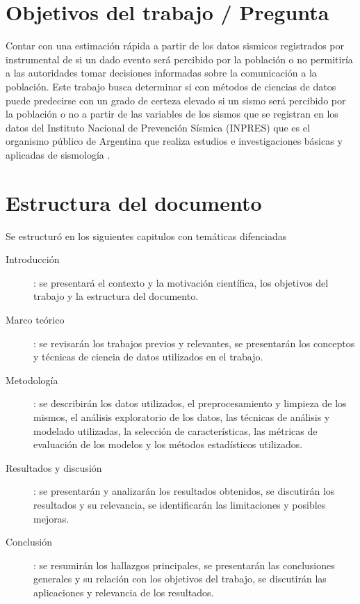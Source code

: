 \documentclass[a4paper]{report}
\begin{document}
\section{Objetivos del trabajo / Pregunta}
Contar con una estimación rápida a partir de los datos sismicos registrados por instrumental de si un dado evento será percibido por la población o no permitiría a las autoridades tomar decisiones informadas sobre la comunicación a la población.
Este trabajo busca determinar si con métodos de ciencias de datos puede predecirse con un grado de certeza elevado si un sismo será percibido por la población o no a partir de las variables de los sismos que se registran en los datos del Instituto Nacional de Prevención Sísmica (INPRES) que es el organismo público de Argentina que realiza estudios e investigaciones básicas y aplicadas de sismología \cite{noauthor_instituto_2022}.



\section{Estructura del documento}

Se estructuró en los siguientes capitulos con temáticas difenciadas
\begin{description}
	\item[Introducción]: se presentará el contexto y la motivación científica, los objetivos del trabajo y la estructura del documento.
	\item[Marco teórico]: se revisarán los trabajos previos y relevantes, se presentarán los conceptos y técnicas de ciencia de datos utilizados en el trabajo.
	\item[Metodología]: se describirán los datos utilizados, el preprocesamiento y limpieza de los mismos, el análisis exploratorio de los datos, las técnicas de análisis y modelado utilizadas, la selección de características, las métricas de evaluación de los modelos y los métodos estadísticos utilizados.
	\item[Resultados y discusión]: se presentarán y analizarán los resultados obtenidos, se discutirán los resultados y su relevancia, se identificarán las limitaciones y posibles mejoras.
	\item[Conclusión]: se resumirán los hallazgos principales, se presentarán las conclusiones generales y su relación con los objetivos del trabajo, se discutirán las aplicaciones y relevancia de los resultados.
\end{description}
\end{document}
